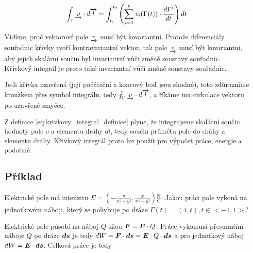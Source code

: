 \begin{equation}
\label{eq:krivkovy_integral_vypocet}
\begin{split}
\int_\Gamma \underrightarrow{v} \cdot d\overrightarrow{l} =
\int_{t_1}^{t_2} \left(\sum_{i=1}^n v_i(\Gamma(t)) \cdot \frac{d \Gamma^i}{dt} \right) dt
\end{split}
\end{equation}

Vidíme, proč vektorové pole \(\underrightarrow{v}\) musí být kovariantní. Protože diferenciály souřadnic křivky tvoří kontravariantní vektor, tak pole \(\underrightarrow{v}\) musí být kovariantní, aby jejich skalární součin byl invariantní vůči změně soustavy souřadnic. Křivkový integrál je proto také invariantní vůči změně soustavy souřadnic.

Je-li křivka uzavřená (její počáteční a koncový bod jsou shodné), toto zdůrazníme kroužkem přes symbol integrálu, tedy \(\oint_\Gamma \underrightarrow{v} \cdot d\overrightarrow{l}\), a říkáme mu cirkulace vektoru po uzavřené smyčce.

Z definice \eqref{eq:krivkovy_integral_definice} plyne, že integrujeme skalární součin hodnoty pole \(v\) a elementu dráhy \(dl\),
tedy součin průmětu pole do dráhy a elementu dráhy. Křivkový integrál proto lze použít pro výpočet práce, energie a podobně.


\subsection{Příklad}

Elektrické pole má intenzitu \(E = \left(-\frac{y}{x^2+y^2}, \frac{x}{x^2+y^2}\right) \frac{\mathrm{N}}{\mathrm{C}}\). Jakou práci pole vykoná na jednotkovém náboji, který se pohybuje po dráze \(\Gamma(t) = (1, t), t \in <-1, 1>\)?




Elektrické pole působí na náboj \(Q\) silou \(\boldsymbol{F} = \boldsymbol{E} \cdot Q\). Práce vykonaná přesunutím náboje \(Q\) po dráze \(\boldsymbol{ds}\) je tedy \(dW = \boldsymbol{F} \cdot \boldsymbol{ds} = \boldsymbol{E} \cdot Q \cdot \boldsymbol{ds}\) a pro jednotkový náboj \(dW = \boldsymbol{E} \cdot \boldsymbol{ds}\). Celková práce je tedy

